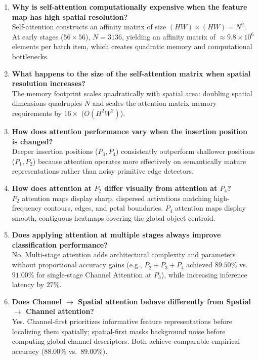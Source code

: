 \documentclass[11pt,a4paper]{article}
\begin{document}
\begin{enumerate}[label=\textbf{\arabic*.}]
    \item \textbf{Why is self-attention computationally expensive when the feature map has high spatial resolution?} \\
    Self-attention constructs an affinity matrix of size $(HW) \times (HW) = N^2$. At early stages ($56 \times 56$), $N = 3136$, yielding an affinity matrix of $\approx 9.8 \times 10^6$ elements per batch item, which creates quadratic memory and computational bottlenecks.

    \item \textbf{What happens to the size of the self-attention matrix when spatial resolution increases?} \\
    The memory footprint scales quadratically with spatial area: doubling spatial dimensions quadruples $N$ and scales the attention matrix memory requirements by $16\times$ ($O(H^2 W^2)$).

    \item \textbf{How does attention performance vary when the insertion position is changed?} \\
    Deeper insertion positions ($P_3, P_4$) consistently outperform shallower positions ($P_1, P_2$) because attention operates more effectively on semantically mature representations rather than noisy primitive edge detectors.

    \item \textbf{How does attention at $P_2$ differ visually from attention at $P_4$?} \\
    $P_2$ attention maps display sharp, dispersed activations matching high-frequency contours, edges, and petal boundaries. $P_4$ attention maps display smooth, contiguous heatmaps covering the global object centroid.

    \item \textbf{Does applying attention at multiple stages always improve classification performance?} \\
    No. Multi-stage attention adds architectural complexity and parameters without proportional accuracy gains (e.g., $P_2+P_3+P_4$ achieved $89.50\%$ vs.\ $91.00\%$ for single-stage Channel Attention at $P_3$), while increasing inference latency by $27\%$.

    \item \textbf{Does Channel $\to$ Spatial attention behave differently from Spatial $\to$ Channel attention?} \\
    Yes. Channel-first prioritizes informative feature representations before localizing them spatially; spatial-first masks background noise before computing global channel descriptors. Both achieve comparable empirical accuracy ($88.00\%$ vs.\ $89.00\%$).


\end{enumerate}
\end{document}
